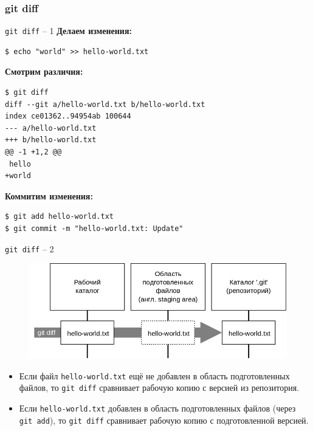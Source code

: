 \documentclass[presentation]{beamer}
\begin{document}


\subsubsection{git diff}

\begin{frame}[fragile]{\texttt{git diff} -- 1}
  \textbf{Делаем изменения:}
\begin{verbatim}
$ echo "world" >> hello-world.txt
\end{verbatim}
  \textbf{Смотрим различия:}
\begin{verbatim}
$ git diff
diff --git a/hello-world.txt b/hello-world.txt
index ce01362..94954ab 100644
--- a/hello-world.txt
+++ b/hello-world.txt
@@ -1 +1,2 @@
 hello
+world
\end{verbatim}
  \textbf{Коммитим изменения:}
\begin{verbatim}
$ git add hello-world.txt
$ git commit -m "hello-world.txt: Update"
\end{verbatim}
\end{frame}

\begin{frame}[fragile]{\texttt{git diff} -- 2}
  \begin{figure}[htb]
    \centering
    \includegraphics[width=1\textwidth]{git-operation-diff}
  \end{figure}
  \begin{itemize}
  \item Если файл \texttt{hello-world.txt} ещё не добавлен в область
    подготовленных файлов, то \texttt{git diff} сравнивает рабочую
    копию с версией из репозитория.
  \item Если \texttt{hello-world.txt} добавлен в область
    подготовленных файлов (через \texttt{git add}), то \texttt{git
      diff} сравнивает рабочую копию с подготовленной версией.
  \end{itemize}
\end{frame}


\end{document}

